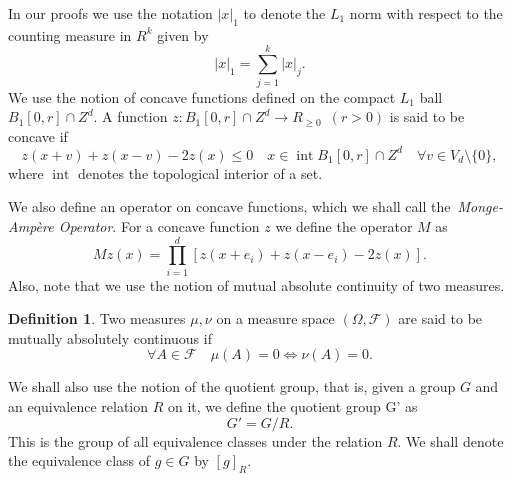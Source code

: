 \documentclass[final]{aomart}
\def\mathbb#1{#1}%
\theoremstyle{plain}
\theoremstyle{definition}
\newtheorem{definition}[theorem]{Definition}
\theoremstyle{remark}
\begin{document}
In our proofs we use the notation $|x|_1$ to denote the $L_1$ norm with respect to the counting measure in $\mathbb{R}^k$ given by \[
|x|_1 = \sum_{j=1}^k |x|_j. 
\] 
We use the notion of concave functions defined on the compact $L_1$ ball $B_1[0,r] \cap \mathbb{Z}^d$. A function $z: B_1[0,r] \cap \mathbb{Z}^d \to \mathbb{R}_{\geq0}$~$(r>0)$ is said to be concave if \[
z(x+ v) +z(x-v) -2z(x) \leq 0\quad x \in \operatorname{int} B_1[0,r] \cap \mathbb{Z}^d \quad \forall v \in V_d\setminus \{0\},
\]
where $\operatorname{int}$ denotes the topological interior of a set. 

We also define an operator on concave functions, which we shall call the~\textit{Monge-Ampère Operator}. For a concave function $z$ we define the operator $M$ as\[
Mz(x) = \prod_{i=1}^d [z(x+e_i)+z(x-e_i) -2z(x)].
\]
Also, note that we use the notion of mutual absolute continuity of two measures. 
\begin{definition}
    Two measures $\mu, \nu$ on a measure space $(\Omega, \mathcal{F})$ are said to be mutually absolutely continuous if \[
    \forall A \in \mathcal{F}\quad\mu(A)=0\iff \nu(A)=0.
    \]
\end{definition}

We shall also use the notion of the quotient group, that is, given a group $G$ and an equivalence relation $R$ on it, we define the quotient group G' as \[
G' = G/R.
\]
This is the group of all equivalence classes under the relation $R$. We shall denote the equivalence class of $g \in G$ by $[g]_R$. 
\end{document}
